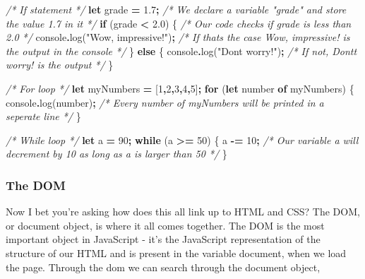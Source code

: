 \documentclass[
]{article}
\newenvironment{Shaded}{\begin{snugshade}}{\end{snugshade}}
\newcommand{\BuiltInTok}[1]{#1}
\newcommand{\CommentTok}[1]{\textcolor[rgb]{0.56,0.35,0.01}{\textit{#1}}}
\newcommand{\ControlFlowTok}[1]{\textcolor[rgb]{0.13,0.29,0.53}{\textbf{#1}}}
\newcommand{\DecValTok}[1]{\textcolor[rgb]{0.00,0.00,0.81}{#1}}
\newcommand{\FloatTok}[1]{\textcolor[rgb]{0.00,0.00,0.81}{#1}}
\newcommand{\FunctionTok}[1]{\textcolor[rgb]{0.00,0.00,0.00}{#1}}
\newcommand{\KeywordTok}[1]{\textcolor[rgb]{0.13,0.29,0.53}{\textbf{#1}}}
\newcommand{\NormalTok}[1]{#1}
\newcommand{\OperatorTok}[1]{\textcolor[rgb]{0.81,0.36,0.00}{\textbf{#1}}}
\newcommand{\StringTok}[1]{\textcolor[rgb]{0.31,0.60,0.02}{#1}}
\begin{document}
\begin{Shaded}
\begin{Highlighting}[]
\CommentTok{/* If statement */}
\KeywordTok{let}\NormalTok{ grade }\OperatorTok{=} \FloatTok{1.7}\OperatorTok{;} \CommentTok{/* We declare a variable "grade" and store the value 1.7 in it */}
\ControlFlowTok{if}\NormalTok{ (grade }\OperatorTok{\textless{}} \FloatTok{2.0}\NormalTok{) \{ }\CommentTok{/* Our code checks if grade is less than 2.0 */}
  \BuiltInTok{console}\OperatorTok{.}\FunctionTok{log}\NormalTok{(}\StringTok{"Wow, impressive!"}\NormalTok{)}\OperatorTok{;} \CommentTok{/* If that\textquotesingle{}s the case \textquotesingle{}Wow, impressive!\textquotesingle{} is the output in the console */}
\NormalTok{\}}
\ControlFlowTok{else}\NormalTok{ \{}
  \BuiltInTok{console}\OperatorTok{.}\FunctionTok{log}\NormalTok{(}\StringTok{"Don\textquotesingle{}t worry!"}\NormalTok{)}\OperatorTok{;} \CommentTok{/* If not, \textquotesingle{}Dont\textquotesingle{}t worry!\textquotesingle{} is the output */}
\NormalTok{\}}

\CommentTok{/* For loop */}
\KeywordTok{let}\NormalTok{ myNumbers }\OperatorTok{=}\NormalTok{ [}\DecValTok{1}\OperatorTok{,}\DecValTok{2}\OperatorTok{,}\DecValTok{3}\OperatorTok{,}\DecValTok{4}\OperatorTok{,}\DecValTok{5}\NormalTok{]}\OperatorTok{;}
\ControlFlowTok{for}\NormalTok{ (}\KeywordTok{let}\NormalTok{ number }\KeywordTok{of}\NormalTok{ myNumbers) \{}
  \BuiltInTok{console}\OperatorTok{.}\FunctionTok{log}\NormalTok{(number)}\OperatorTok{;} \CommentTok{/* Every number of myNumbers will be printed in a seperate line */}
\NormalTok{\}}

\CommentTok{/* While loop */}
\KeywordTok{let}\NormalTok{ a }\OperatorTok{=} \DecValTok{90}\OperatorTok{;}
\ControlFlowTok{while}\NormalTok{ (a }\OperatorTok{\textgreater{}=} \DecValTok{50}\NormalTok{) \{}
\NormalTok{  a }\OperatorTok{{-}=} \DecValTok{10}\OperatorTok{;}  \CommentTok{/* Our variable a will decrement by 10 as long as a is larger than 50 */}
\NormalTok{\}}
\end{Highlighting}
\end{Shaded}

\hypertarget{the-dom}{%
\subsubsection*{The DOM}\label{the-dom}}

Now I bet you're asking how does this all link up to HTML and CSS? The DOM, or document object, is where it all comes together. The DOM is the most important object in JavaScript - it's the JavaScript representation of the structure of our HTML and is present in the variable document, when we load the page. Through the dom we can search through the document object,
\end{document}
